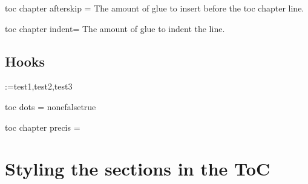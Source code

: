 \begin{docKey}[phd]{toc chapter afterskip}{ =}{}
The amount of glue to insert before the toc chapter line.
\end{docKey}

\begin{docKey}[phd]{toc chapter indent}{=}{}
The amount of glue to indent the line.
\end{docKey}
\subsection{Hooks}


\makeatletter
\def\options#1{
\@for\next:=#1\do{%
\textbar\next%
}%
\textbar%
}%
\options{test1,test2,test3}
\makeatother
\begin{docKey}[phd]{toc dots}{ = \textbar none\textbar false\textbar true}{}
\end{docKey}

%
%
%
%

\begin{docKey}[phd]{toc chapter precis} { = }{}
\end{docKey}

\section{Styling the sections in the ToC}

